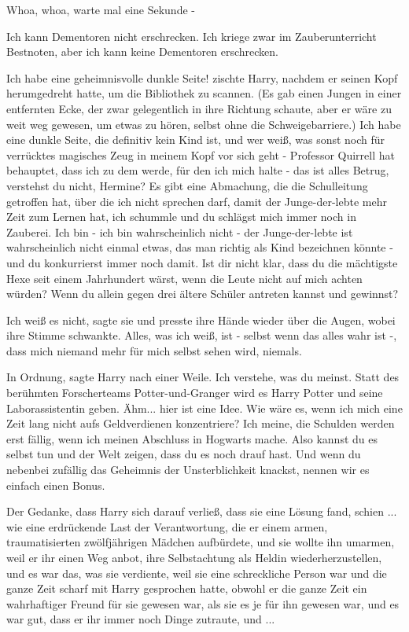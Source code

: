 \glqq Whoa, whoa, warte mal eine Sekunde -\grqq{}

\glqq Ich kann Dementoren nicht erschrecken. Ich kriege zwar im Zauberunterricht
Bestnoten, aber ich kann keine Dementoren erschrecken.\grqq{}

\glqq Ich habe eine geheimnisvolle dunkle Seite!\grqq{} zischte Harry, nachdem
er seinen Kopf herumgedreht hatte, um die Bibliothek zu scannen. (Es gab einen
Jungen in einer entfernten Ecke, der zwar gelegentlich in ihre Richtung schaute,
aber er wäre zu weit weg gewesen, um etwas zu hören, selbst ohne die
Schweigebarriere.) \glqq Ich habe eine dunkle Seite, die definitiv kein Kind
ist, und wer weiß, was sonst noch für verrücktes magisches Zeug in meinem Kopf
vor sich geht - Professor Quirrell hat behauptet, dass ich zu dem werde, für den
ich mich halte - das ist alles Betrug, verstehst du nicht, Hermine? Es gibt eine
Abmachung, die die Schulleitung getroffen hat, über die ich nicht sprechen darf,
damit der Junge-der-lebte mehr Zeit zum Lernen hat, ich schummle und du schlägst
mich immer noch in Zauberei. Ich bin - ich bin wahrscheinlich nicht - der
Junge-der-lebte ist wahrscheinlich nicht einmal etwas, das man richtig als Kind
bezeichnen könnte - und du konkurrierst immer noch damit. Ist dir nicht klar,
dass du die mächtigste Hexe seit einem Jahrhundert wärst, wenn die Leute nicht
auf mich achten würden? Wenn du allein gegen drei ältere Schüler antreten kannst
und gewinnst?\grqq{}

\glqq Ich weiß es nicht\grqq{}, sagte sie und presste ihre Hände wieder über die
Augen, wobei ihre Stimme schwankte. \glqq Alles, was ich weiß, ist - selbst wenn
das alles wahr ist -, dass mich niemand mehr für mich selbst sehen wird,
niemals.\grqq{}

\glqq In Ordnung\grqq{}, sagte Harry nach einer Weile. \glqq Ich verstehe, was
du meinst. Statt des berühmten Forscherteams Potter-und-Granger wird es Harry
Potter und seine Laborassistentin geben. Ähm... hier ist eine Idee. Wie wäre es,
wenn ich mich eine Zeit lang nicht aufs Geldverdienen konzentriere? Ich meine,
die Schulden werden erst fällig, wenn ich meinen Abschluss in Hogwarts mache.
Also kannst du es selbst tun und der Welt zeigen, dass du es noch drauf hast.
Und wenn du nebenbei zufällig das Geheimnis der Unsterblichkeit knackst, nennen
wir es einfach einen Bonus.\grqq{}

Der Gedanke, dass Harry sich darauf verließ, dass sie eine Lösung fand, schien
... wie eine erdrückende Last der Verantwortung, die er einem armen,
traumatisierten zwölfjährigen Mädchen aufbürdete, und sie wollte ihn umarmen,
weil er ihr einen Weg anbot, ihre Selbstachtung als Heldin wiederherzustellen,
und es war das, was sie verdiente, weil sie eine schreckliche Person war und die
ganze Zeit scharf mit Harry gesprochen hatte, obwohl er die ganze Zeit ein
wahrhaftiger Freund für sie gewesen war, als sie es je für ihn gewesen war, und
es war gut, dass er ihr immer noch Dinge zutraute, und ...

